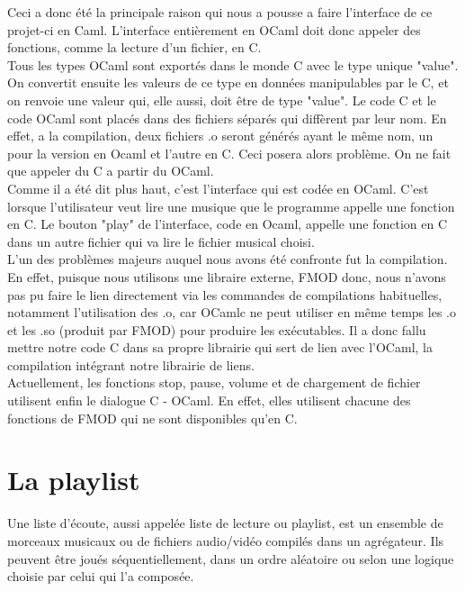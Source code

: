 \documentclass[12pt,a4paper]{report}
\begin{document}
Ceci a donc été la principale raison qui nous a pousse a faire l'interface de ce projet-ci en Caml. L'interface entièrement en OCaml doit donc appeler des fonctions, comme la lecture d'un fichier, en C.\\

Tous les types OCaml sont exportés dans le monde C avec le type unique "value". On convertit ensuite les valeurs de ce type en données manipulables par le C, et on renvoie une valeur qui, elle aussi, doit être de type "value". Le code C et le code OCaml sont placés dans des fichiers séparés qui diffèrent par leur nom. En effet, a la compilation, deux fichiers .o seront générés ayant le même nom, un pour la version en Ocaml et l'autre en C. Ceci posera alors problème. On ne fait que appeler du C a partir du OCaml.\\

Comme il a été dit plus haut, c'est l'interface qui est codée en OCaml. C'est lorsque l'utilisateur veut lire une musique que le programme appelle une fonction en C. Le bouton "play" de l'interface, code en Ocaml, appelle une fonction en C dans un autre fichier qui va lire le fichier musical choisi.\\

L'un des problèmes majeurs auquel nous avons été confronte fut la compilation. En effet, puisque nous utilisons une libraire externe, FMOD donc, nous n'avons pas pu faire le lien directement via les commandes de compilations habituelles, notamment l'utilisation des .o, car OCamlc ne peut utiliser en même temps les .o et les .so (produit par FMOD) pour produire les exécutables. Il a donc fallu mettre notre code C dans sa propre librairie qui sert de lien avec l'OCaml, la compilation intégrant notre librairie de liens.\\

Actuellement, les fonctions stop, pause, volume et de chargement de fichier utilisent enfin le dialogue C - OCaml. En effet, elles utilisent chacune des fonctions de FMOD qui ne sont disponibles qu'en C.

\chapter{La playlist}

Une liste d'écoute, aussi appelée liste de lecture ou playlist, est un ensemble de morceaux musicaux ou de fichiers audio/vidéo compilés dans un agrégateur. Ils peuvent être joués séquentiellement, dans un ordre aléatoire ou selon une logique choisie par celui qui l'a composée.\\
\end{document}
